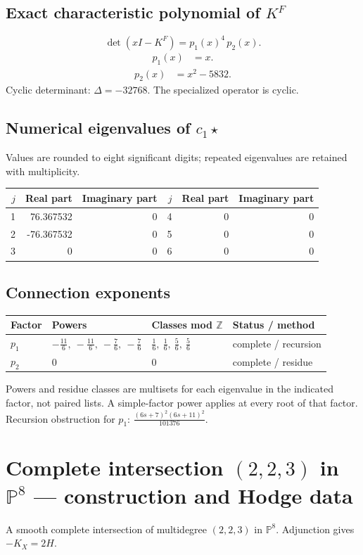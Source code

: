 \documentclass[10pt,a4paper]{article}
\begin{document}
\subsection*{Exact characteristic polynomial of $K^F$}
\[\det(xI-K^F)=p_{1}(x)^{4}\,p_{2}(x).\]
\[\begin{aligned}p_{1}(x)&=x.\end{aligned}\]
\[\begin{aligned}p_{2}(x)&=x^{2} - 5832.\end{aligned}\]
Cyclic determinant: $\Delta=-32768$. The specialized operator is cyclic.
\subsection*{Numerical eigenvalues of $c_1\star$}
Values are rounded to eight significant digits; repeated eigenvalues are retained with multiplicity.
\begin{center}\small\begin{tabular}{rrr@{\qquad}rrr}\toprule $j$ & Real part & Imaginary part & $j$ & Real part & Imaginary part\\\midrule
1 & 76.367532 & 0 & 4 & 0 & 0\\
2 & -76.367532 & 0 & 5 & 0 & 0\\
3 & 0 & 0 & 6 & 0 & 0\\
\bottomrule\end{tabular}\end{center}
\subsection*{Connection exponents}
\begin{center}\begin{tabular}{llll}\toprule Factor & Powers & Classes mod $\mathbb Z$ & Status / method\\\midrule
$p_{1}$ & $- \frac{11}{6},\ - \frac{11}{6},\ - \frac{7}{6},\ - \frac{7}{6}$ & $\frac{1}{6},\ \frac{1}{6},\ \frac{5}{6},\ \frac{5}{6}$ & complete / recursion\\
$p_{2}$ & $0$ & $0$ & complete / residue\\
\bottomrule\end{tabular}\end{center}
Powers and residue classes are multisets for each eigenvalue in the indicated factor, not paired lists. A simple-factor power applies at every root of that factor.
Recursion obstruction for $p_{1}$: $\frac{\left(6 s + 7\right)^{2} \left(6 s + 11\right)^{2}}{101376}$.
\clearpage\section*{Complete intersection $(2,2,3)$ in $\mathbb P^{8}$ --- construction and Hodge data}\label{entry:PCI5-2-2-3}
A smooth complete intersection of multidegree $(2,2,3)$ in $\mathbb P^{8}$.
Adjunction gives $-K_X=2H$.
\end{document}
